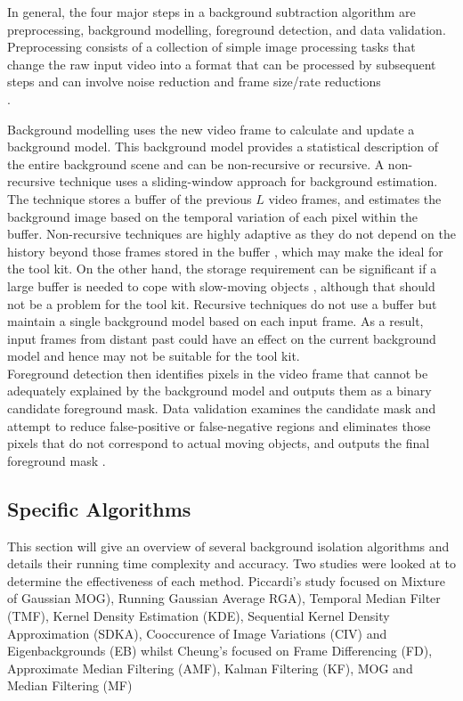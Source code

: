 In general, the four major steps in a background subtraction algorithm are preprocessing, background modelling, foreground detection, and data validation.
Preprocessing consists of a collection of simple image processing tasks that change the raw input video into a format that can be processed by subsequent steps and can involve noise reduction and frame size/rate reductions \cite{Cheung2007}\\.

Background modelling uses the new video frame to calculate and update a background model.
This background model provides a statistical description of the entire background scene and can be non-recursive or recursive. 
A non-recursive technique uses a sliding-window approach for background estimation. 
The technique stores a buffer of the previous $L$ video frames, and estimates the background image based on the temporal variation of each pixel within the buffer.
Non-recursive techniques are highly adaptive as they do not depend on the history beyond those frames stored in the buffer \cite{Cheung2007}, which may make the ideal for the tool kit.
On the other hand, the storage requirement can be significant if a large buffer
is needed to cope with slow-moving objects \cite{Cheung2007}, although that should not be a problem for the tool kit. Recursive techniques do not use a buffer but maintain a single background model based on each input frame. As a result, input frames from distant past could have an effect on the current background model \cite{Cheung2007} and hence may not be suitable for the tool kit.\\

Foreground detection then identifies pixels in the video frame that cannot be adequately explained by the background model and outputs them as a binary candidate foreground mask. 
Data validation examines the candidate mask and attempt to reduce false-positive or false-negative regions and eliminates those pixels that do not correspond to actual moving objects, and outputs the final foreground mask \cite{Cheung2007}.\\

\subsection{Specific Algorithms}
This section will give an overview of several background isolation algorithms and details their running time complexity and accuracy. Two studies were looked at to determine the effectiveness of each method. Piccardi's \cite{Piccardi2004} study focused on Mixture of Gaussian MOG), Running Gaussian Average RGA), Temporal Median Filter (TMF), Kernel Density Estimation (KDE), Sequential Kernel Density Approximation (SDKA), Cooccurence of Image Variations (CIV) and Eigenbackgrounds (EB) whilst Cheung's \cite{Cheung2007} focused on Frame Differencing (FD), Approximate Median Filtering (AMF), Kalman Filtering (KF), MOG and Median Filtering (MF) \\

